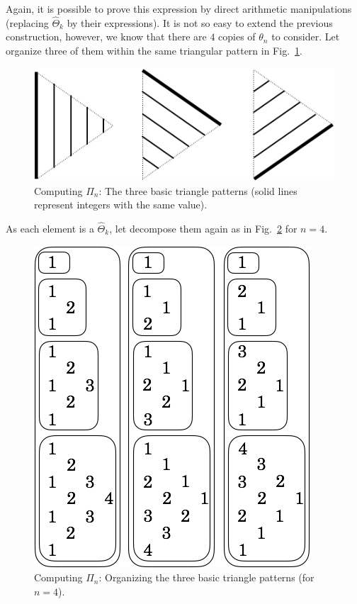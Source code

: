 Again, it is possible to prove this expression by direct arithmetic manipulations
(replacing $\widehat{\Theta}_k$ by their expressions). 
It is not so easy to extend the previous construction, however, we know that there are $4$ copies of $\theta_n$ to consider.
Let organize three of them within the same triangular pattern in Fig.~\ref{fig:Tetrahedral6}.
\begin{figure}[h]
\begin{center}
        \includegraphics[scale=0.35]{FiguresArithmetic/appTetrahedral6}
        \caption{Computing $\Pi_n$: The three basic triangle patterns (solid lines represent integers with the same value).}
        \label{fig:Tetrahedral6}
\end{center}
\end{figure}
As each element is a $\widehat{\Theta}_k$, let decompose them again as in Fig.~\ref{fig:Tetrahedral7} for $n=4$.
\begin{figure}[h]
\begin{center}
        \includegraphics[scale=0.36]{FiguresArithmetic/appTetrahedral7}
        \caption{Computing $\Pi_n$: Organizing the three basic triangle patterns (for $n=4$).}
        \label{fig:Tetrahedral7}
\end{center}
\end{figure}
